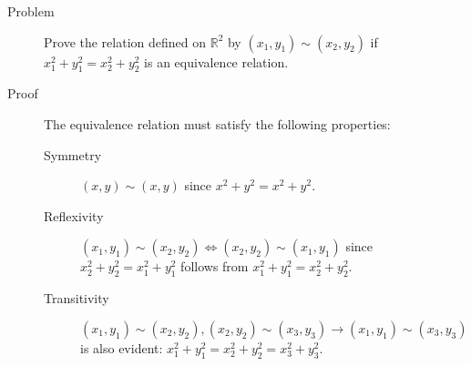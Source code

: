 \begin{description}
\item[Problem] Prove the relation defined on $\mathbb{R}^2$ by $(x_1, y_1)
\sim (x_2, y_2)$ if $x_1^2 + y_1^2 = x_2^2 + y_2^2$ is an equivalence
relation.
\item[Proof] The equivalence relation must satisfy the following properties:
\begin{description}
        \item[Symmetry] $(x, y) \sim (x, y)$ since $x^2 + y^2 = x^2 + y^2$.
        \item[Reflexivity] $(x_1, y_1) \sim (x_2, y_2) \iff (x_2, y_2) \sim
                (x_1, y_1)$ since $x_2^2 + y_2^2 = x_1^2 + y_1^2$ follows from
                $x_1^2 + y_1^2 = x_2^2 + y_2^2$.
        \item[Transitivity] $(x_1, y_1) \sim (x_2, y_2), (x_2, y_2) \sim
                (x_3, y_3) \rightarrow (x_1, y_1) \sim (x_3, y_3)$ is also
                evident: $x_1^2 + y_1^2 = x_2^2 + y_2^2 = x_3^2 + y_3^2$.
\end{description}
\end{description}
